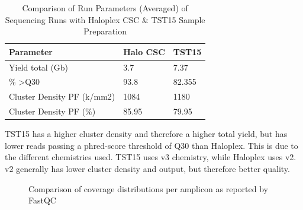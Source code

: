 \begin{table}[!htbp]
    \caption[ISV]{Comparison of Run Parameters (Averaged) of Sequencing Runs with Haloplex CSC \& TST15 Sample Preparation}
    \centering
    \begin{tabular}{ |p{4.5cm}|p{1.5cm}|p{1.5cm}|}
    \hline
    Parameter & Halo CSC & TST15 \\ \hline \hline
    Yield total (Gb) & 3.7 & 7.37 \\
    \% \textgreater Q30 & 93.8 & 82.355 \\
    Cluster Density PF (k/mm2) & 1084 & 1180  \\
    Cluster Density PF (\%) & 85.95 & 79.95
    \hline
    \label{sequencing_viewer}
  \end{tabular}
\end{table}

TST15 has a higher cluster density and therefore a higher total yield, but has
lower reads passing a phred-score threshold of Q30 than Haloplex. This is due to
the different chemistries used. TST15 uses v3 chemistry, while Haloplex uses v2.
v2 generally has lower cluster density and output, but therefore better quality.

\begin{figure}[!tbp]
  \centering
  \hfill
  \caption{Comparison of coverage distributions per amplicon as reported by FastQC}
\end{figure}

